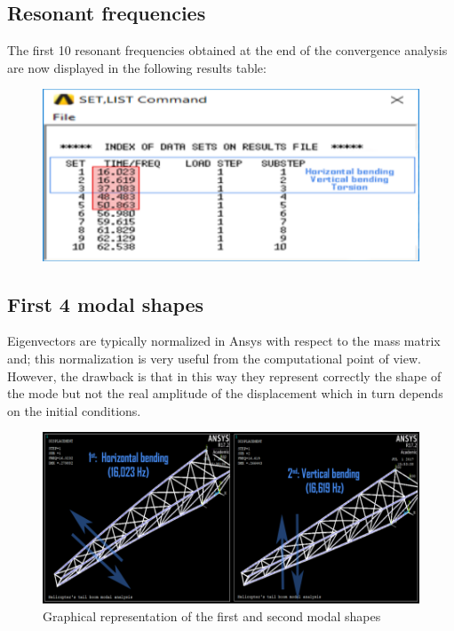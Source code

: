 \subsection*{Resonant frequencies}
\noindent
The first 10 resonant frequencies obtained at the end of the convergence analysis are now displayed in the following results table:
\begin{figure}[h]
	\begin{center}
		\centering  		 		
		\includegraphics[width=0.70\linewidth]{PICTURES/2_Lama_truss/PNG/set-list.png}
	\end{center}
\end{figure}

\subsection*{First 4 modal shapes}
\noindent
Eigenvectors are typically normalized in Ansys with respect to the mass matrix and; this normalization is very useful from the computational point of view. However, the drawback is that in this way they represent correctly the shape of the mode but not the real amplitude of the displacement which in turn depends on the initial conditions. 

\begin{figure}[h]
	\begin{center}
		\centering  		 		
		\includegraphics[width=0.95\linewidth]{PICTURES/2_Lama_truss/PNG/1-2.png}
	\end{center}
	\caption {Graphical representation of the first and second modal shapes}
\end{figure}

